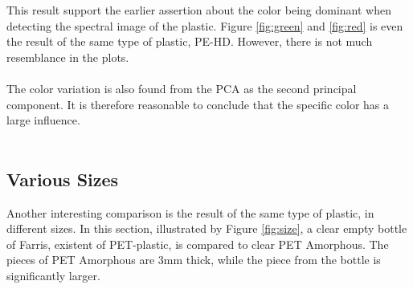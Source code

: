 
\noindent
This result support the earlier assertion about the color being dominant when detecting the spectral image of the plastic. Figure \ref{fig:green} and \ref{fig:red} is even the result of the same type of plastic, PE-HD. However, there is not much resemblance in the plots.
\\\\
The color variation is also found from the PCA as the second principal component. It is therefore reasonable to conclude that the specific color has a large influence.
\\\\
\subsection{Various Sizes}
Another interesting comparison is the result of the same type of plastic, in different sizes. In this section, illustrated by Figure \ref{fig:size}, a clear empty bottle of Farris, existent of PET-plastic, is compared to clear PET Amorphous. The pieces of PET Amorphous are 3mm thick, while the piece from the bottle is significantly larger. 

